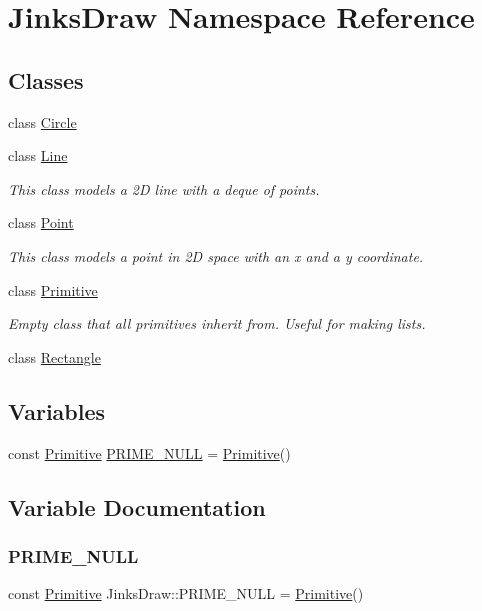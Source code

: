 \hypertarget{namespace_jinks_draw}{}\section{Jinks\+Draw Namespace Reference}
\label{namespace_jinks_draw}
\subsection*{Classes}
\begin{DoxyCompactItemize}
\item 
class \mbox{\hyperlink{class_jinks_draw_1_1_circle}{Circle}}
\item 
class \mbox{\hyperlink{class_jinks_draw_1_1_line}{Line}}
\begin{DoxyCompactList}\small\item\em This class models a 2D line with a deque of points. \end{DoxyCompactList}\item 
class \mbox{\hyperlink{class_jinks_draw_1_1_point}{Point}}
\begin{DoxyCompactList}\small\item\em This class models a point in 2D space with an x and a y coordinate. \end{DoxyCompactList}\item 
class \mbox{\hyperlink{class_jinks_draw_1_1_primitive}{Primitive}}
\begin{DoxyCompactList}\small\item\em Empty class that all primitives inherit from. Useful for making lists. \end{DoxyCompactList}\item 
class \mbox{\hyperlink{class_jinks_draw_1_1_rectangle}{Rectangle}}
\end{DoxyCompactItemize}
\subsection*{Variables}
\begin{DoxyCompactItemize}
\item 
const \mbox{\hyperlink{class_jinks_draw_1_1_primitive}{Primitive}} \mbox{\hyperlink{namespace_jinks_draw_a1d4bdcc49484a3abfad71c82b5c56225}{P\+R\+I\+M\+E\+\_\+\+N\+U\+LL}} = \mbox{\hyperlink{class_jinks_draw_1_1_primitive}{Primitive}}()
\end{DoxyCompactItemize}


\subsection{Variable Documentation}
\mbox{\label{namespace_jinks_draw_a1d4bdcc49484a3abfad71c82b5c56225}} 
\subsubsection{\texorpdfstring{P\+R\+I\+M\+E\+\_\+\+N\+U\+LL}{PRIME\_NULL}}
{\footnotesize\ttfamily const \mbox{\hyperlink{class_jinks_draw_1_1_primitive}{Primitive}} Jinks\+Draw\+::\+P\+R\+I\+M\+E\+\_\+\+N\+U\+LL = \mbox{\hyperlink{class_jinks_draw_1_1_primitive}{Primitive}}()}

